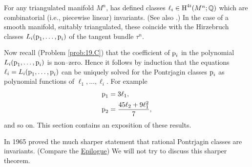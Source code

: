 \documentclass[../main]{subfiles}
\begin{document}
For any triangulated manifold $M^n$, \cite{thom1968} has defined classes $\ell_i \in \operatorname{H}^{4i}(M^n; \mathbb Q)$ which are combinatorial (i.e., piecewise linear) invariants. (See also \cite{rokhlin1957}.) In the case of a smooth manifold, suitably triangulated, these coincide with the Hirzebruch classes $L_i(\operatorname{p}_1, \ldots, \operatorname{p}_i)$ of the tangent bundle $\tau^n$. 

Now recall (Problem \ref{prob:19.C}) that the coefficient of $\operatorname{p}_i$ in the polynomial $L_i(\operatorname{p}_1, \ldots, \operatorname{p}_i)$ is non--zero. Hence it follows by induction that the equations $\ell_i = L_i(\operatorname{p}_1, \ldots, \operatorname{p}_i)$ can be uniquely solved for the Pontrjagin classes $\operatorname{p}_i$ as polynomial functions of $\ell_1, \ldots, \ell_i$. For example
\begin{align*}
\operatorname{p}_1 & = 3 \ell_1, \\ \operatorname{p}_2 & = \dfrac{45 \ell_2 + 9 \ell_1^2}{7},
\end{align*}
and so on.  This section contains an exposition of these results. 

In 1965 \cite{novikov1966} proved the much sharper statement that rational Pontrjagin classes are  invariants. (Compare the \hyperref[ch:21]{Epilogue}) We will not try to discuss this sharper theorem.
\end{document}
